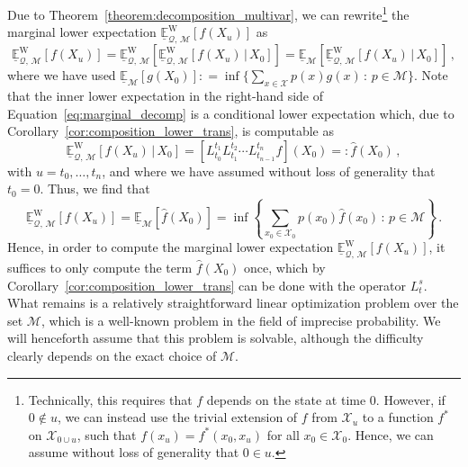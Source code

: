 \documentclass[10pt,a4paper]{paper}
\theoremstyle{definition}
\newcommand{\states}{\mathcal{X}}
\newcommand{\rateset}{\mathcal{Q}}
\newcommand{\coloneqq}{:\!=}
\begin{document}
Due to Theorem~\ref{theorem:decomposition_multivar}, we can rewrite\footnote{Technically, this requires that $f$ depends on the state at time $0$. However, if $0\notin u$, we can instead use the trivial extension of $f$ from $\states_{u}$ to a function $f^*$ on $\states_{0\cup u}$, such that $f(x_u)=f^*(x_0,x_u)$ for all $x_0\in\states_0$. Hence, we can assume without loss of generality that $0\in u$.} the marginal lower expectation $\underline{\mathbb{E}}_{\rateset,\,\mathcal{M}}^\mathrm{W}[f(X_u)]$ as
\begin{equation}\label{eq:marginal_decomp}
\underline{\mathbb{E}}_{\rateset,\,\mathcal{M}}^\mathrm{W}[f(X_u)] = \underline{\mathbb{E}}_{\rateset,\,\mathcal{M}}^\mathrm{W}[\underline{\mathbb{E}}_{\rateset,\,\mathcal{M}}^\mathrm{W}[f(X_u)\,\vert\,X_0]] = \underline{\mathbb{E}}_{\mathcal{M}}[\underline{\mathbb{E}}_{\rateset,\,\mathcal{M}}^\mathrm{W}[f(X_u)\,\vert\,X_0]]\,,
\end{equation}
where we have used $\underline{\mathbb{E}}_{\mathcal{M}}[g(X_0)]\coloneqq \inf\{\sum_{x\in\states}p(x)g(x)\,:\,p\in\mathcal{M}\}$. Note that the inner lower expectation in the right-hand side of Equation~\eqref{eq:marginal_decomp} is a conditional lower expectation which, due to Corollary~\ref{cor:composition_lower_trans}, is computable as
\begin{equation*}
\underline{\mathbb{E}}_{\rateset,\,\mathcal{M}}^\mathrm{W}[f(X_u)\,\vert\,X_0] = \left[L_{t_0}^{t_1}L_{t_1}^{t_2}\cdots L_{t_{n-1}}^{t_n}f\right](X_0) =: \hat{f}(X_0)\,,
\end{equation*}
with $u=t_0,\ldots,t_n$, and where we have assumed without loss of generality that $t_0=0$. Thus, we find that
\begin{equation*}
\underline{\mathbb{E}}_{\rateset,\,\mathcal{M}}^\mathrm{W}[f(X_u)] = \underline{\mathbb{E}}_{\mathcal{M}}[\hat{f}(X_0)] = \inf\left\{\sum_{x_0\in\states_0}p(x_0)\hat{f}(x_0)\,:\,p\in\mathcal{M} \right\}\,.
\end{equation*}
Hence, in order to compute the marginal lower expectation $\underline{\mathbb{E}}_{\rateset,\,\mathcal{M}}^\mathrm{W}[f(X_u)]$, it suffices to only compute the term $\hat{f}(X_0)$ once, which by Corollary~\ref{cor:composition_lower_trans} can be done with the operator $L_t^s$. What remains is a relatively straightforward linear optimization problem over the set $\mathcal{M}$, which is a well-known problem in the field of imprecise probability. We will henceforth assume that this problem is solvable, although the difficulty clearly depends on the exact choice of $\mathcal{M}$.
\end{document}

